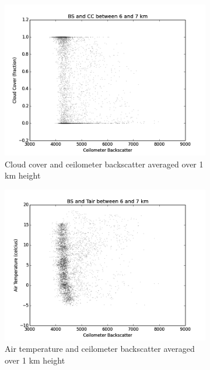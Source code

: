 \documentclass[a4paper,titlepage, twoside]{report}
\begin{document}
\begin{figure}
\centering
\begin{subfigure}{0.48\textwidth}
\includegraphics[width=\textwidth]{BS6_CC.png}
\caption{Cloud cover and ceilometer backscatter averaged over 1 km height}
\end{subfigure}
\hfill
\begin{subfigure}{0.48\textwidth}
\includegraphics[width=\textwidth]{BS6_Tair.png}
\caption{Air temperature and ceilometer backscatter averaged over 1 km height}
\end{subfigure}
\\
\begin{subfigure}{0.48\textwidth}

\end{subfigure}
\end{figure}
\end{document}
